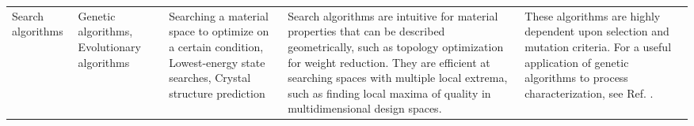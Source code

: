 \begin{table*}
\begin{tabular}{p{2.25cm}|p{2.25cm}|p{3cm}|p{4cm}|p{4cm}}
Search algorithms & \raggedright Genetic algorithms, Evolutionary algorithms & Searching a material space to optimize on a certain condition, Lowest-energy state searches, Crystal structure prediction &  \raggedright Search algorithms are intuitive for material properties that can be described geometrically, such as topology optimization for weight reduction. They are efficient at searching spaces with multiple local extrema, such as finding local maxima of quality in multidimensional design spaces. &  These algorithms are highly dependent upon selection and mutation criteria. For a useful application of genetic algorithms to process characterization, see Ref. \cite{Grefenstette1986}. \\

\end{tabular}
\end{table*}

